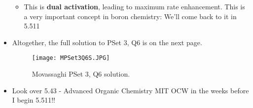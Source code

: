 \documentclass[../notes.tex]{subfiles}
\begin{document}
\begin{itemize}
\begin{itemize}
        \item This is \textbf{dual activation}, leading to maximum rate enhancement. This is a very important concept in boron chemistry: We'll come back to it in 5.511
    \end{itemize}
    \item Altogether, the full solution to PSet 3, Q6 is on the next page.
    \begin{figure}[h!]
        \centering
        \texttt{[image: MPSet3Q6S.JPG]}
        \caption{Movassaghi PSet 3, Q6 solution.}
        \label{fig:MPSet3Q6S}
    \end{figure}
    \pagebreak
    \item Look over 5.43 - Advanced Organic Chemistry MIT OCW in the weeks before I begin 5.511!!
\end{itemize}
\end{document}
